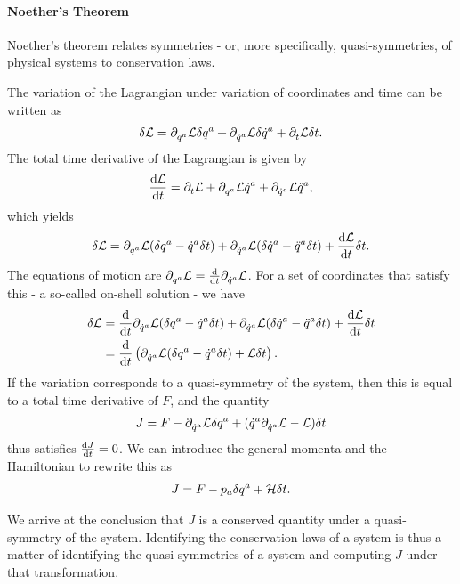 \paragraph{Noether's Theorem}
Noether's theorem relates symmetries - or, more specifically, quasi-symmetries, of physical systems to conservation laws.

The variation of the Lagrangian under variation of coordinates and time can be written as
\begin{align*}
	\delta \mathcal{L} = \partial^{}_{q^{a}}\mathcal{L}\delta q^{a} + \partial^{}_{\dot{q}^{a}}\mathcal{L}\delta \dot{q}^{a} + \partial^{}_{t}\mathcal{L}\delta t.
\end{align*}
The total time derivative of the Lagrangian is given by
\begin{align*}
	\dv{\mathcal{L}}{t} = \partial^{}_{t}\mathcal{L} + \partial^{}_{q^{a}}\mathcal{L}\dot{q}^{a} + \partial^{}_{\dot{q}^{a}}\mathcal{L}\ddot{q}^{a},
\end{align*}
which yields
\begin{align*}
	\delta \mathcal{L} = \partial^{}_{q^{a}}\mathcal{L}(\delta q^{a} - \dot{q}^{a}\delta t) + \partial^{}_{\dot{q}^{a}}\mathcal{L}(\delta \dot{q}^{a} - \ddot{q}^{a}\delta t) + \dv{\mathcal{L}}{t}\delta t.
\end{align*}
The equations of motion are $\partial^{}_{q^{a}}\mathcal{L} = \dv{t}\partial^{}_{\dot{q}^{a}}\mathcal{L}$. For a set of coordinates that satisfy this - a so-called on-shell solution - we have
\begin{align*}
	\delta \mathcal{L} &= \dv{t}\partial^{}_{\dot{q}^{a}}\mathcal{L}(\delta q^{a} - \dot{q}^{a}\delta t) + \partial^{}_{\dot{q}^{a}}\mathcal{L}(\delta \dot{q}^{a} - \ddot{q}^{a}\delta t) + \dv{\mathcal{L}}{t}\delta t \\
	           &= \dv{t}\left(\partial^{}_{\dot{q}^{a}}\mathcal{L}(\delta q^{a} - \dot{q}^{a}\delta t) + \mathcal{L}\delta t\right).
\end{align*}
If the variation corresponds to a quasi-symmetry of the system, then this is equal to a total time derivative of $F$, and the quantity
\begin{align*}
	J = F - \partial^{}_{\dot{q}^{a}}\mathcal{L}\delta q^{a} + (\dot{q}^{a}\partial^{}_{\dot{q}^{a}}\mathcal{L} - \mathcal{L})\delta t
\end{align*}
thus satisfies $\dv{J}{t} = 0$. We can introduce the general momenta and the Hamiltonian to rewrite this as
\begin{align*}
	J = F - p_{a}\delta q^{a} + \mathcal{H}\delta t.
\end{align*}

We arrive at the conclusion that $J$ is a conserved quantity under a quasi-symmetry of the system. Identifying the conservation laws of a system is thus a matter of identifying the quasi-symmetries of a system and computing $J$ under that transformation.

